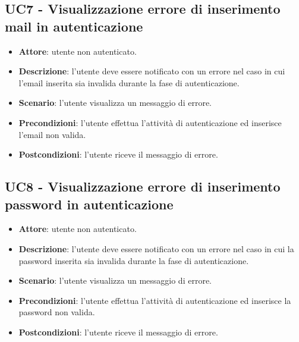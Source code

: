 \subsection{UC7 - Visualizzazione errore di inserimento mail in autenticazione}
\begin{itemize}
    \item \textbf{Attore}: utente non autenticato.
    \item \textbf{Descrizione}: l'utente deve essere notificato con un errore nel caso in cui l'email inserita sia invalida durante la fase di autenticazione.
    \item \textbf{Scenario}: l'utente visualizza un messaggio di errore. 
    \item \textbf{Precondizioni}: l'utente effettua l'attività di autenticazione ed inserisce l'email non valida.
    \item \textbf{Postcondizioni}: l'utente riceve il messaggio di errore.
\end{itemize}

\subsection{UC8 - Visualizzazione errore di inserimento password in autenticazione} 
\begin{itemize}
    \item \textbf{Attore}: utente non autenticato.
    \item \textbf{Descrizione}: l'utente deve essere notificato con un errore nel caso in cui la password inserita sia invalida durante la fase di autenticazione.
    \item \textbf{Scenario}: l'utente visualizza un messaggio di errore. 
    \item \textbf{Precondizioni}: l'utente effettua l'attività di autenticazione ed inserisce la password non valida.
    \item \textbf{Postcondizioni}: l'utente riceve il messaggio di errore.
\end{itemize}

